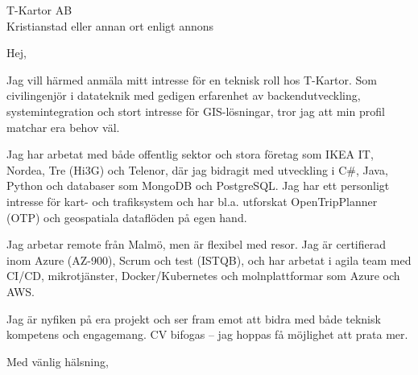 \documentclass[a4paper,10pt]{letter}
\date{\today}
\begin{document}
\begin{letter}{T-Kartor AB\\[0.2cm]
Kristianstad eller annan ort enligt annons}

\opening{Hej,}

Jag vill härmed anmäla mitt intresse för en teknisk roll hos T-Kartor. Som civilingenjör i datateknik med gedigen erfarenhet av backendutveckling, systemintegration och stort intresse för GIS-lösningar, tror jag att min profil matchar era behov väl.

Jag har arbetat med både offentlig sektor och stora företag som IKEA IT, Nordea, Tre (Hi3G) och Telenor, där jag bidragit med utveckling i C\#, Java, Python och databaser som MongoDB och PostgreSQL. Jag har ett personligt intresse för kart- och trafiksystem och har bl.a. utforskat OpenTripPlanner (OTP) och geospatiala dataflöden på egen hand.

Jag arbetar remote från Malmö, men är flexibel med resor. Jag är certifierad inom Azure (AZ-900), Scrum och test (ISTQB), och har arbetat i agila team med CI/CD, mikrotjänster, Docker/Kubernetes och molnplattformar som Azure och AWS.

Jag är nyfiken på era projekt och ser fram emot att bidra med både teknisk kompetens och engagemang. CV bifogas – jag hoppas få möjlighet att prata mer.

\closing{Med vänlig hälsning,}

\end{letter}
\end{document}
